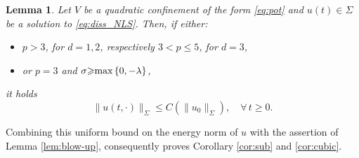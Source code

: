 \documentclass[a4paper,leqno]{amsart}
\theoremstyle{plain}
\newtheorem{lemma}[theorem]{Lemma}
\theoremstyle{definition}
\numberwithin{equation}{section}
\begin{document}
\begin{lemma}\label{lem:sub}
Let $V$ be a quadratic confinement of the form \eqref{eq:pot} and $u(t) \in \Sigma$ be a solution to \eqref{eq:diss_NLS}. 
Then, if either:
\begin{itemize} 
\item 
$p> 3$, for $d=1,2$, respectively $3<p{\leqslant} 5$, for $d=3$,
\item or $p=3$ and $\sigma {\geqslant} \text{\rm max}\, \{0, -\lambda\}$,
\end{itemize}it holds
\begin{equation*}
\| u(t, \cdot) \|_{\Sigma} {\leqslant} C(\| u_0 \|_{\Sigma}),\quad \forall \, t {\geqslant} 0.
\end{equation*}
\end{lemma}
Combining this uniform bound on the energy norm of $u$ with the assertion of Lemma \ref{lem:blow-up}, consequently proves Corollary \ref{cor:sub} and \ref{cor:cubic}.
\end{document}

